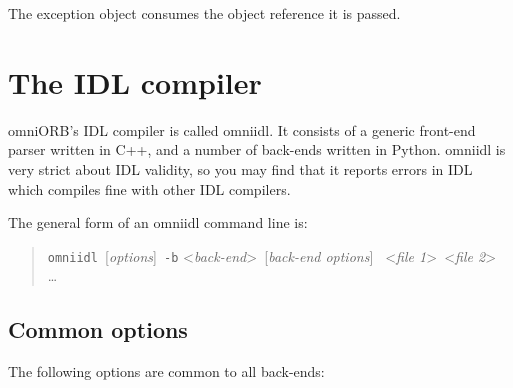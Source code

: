 \documentclass[11pt,twoside,a4paper]{book}
\newcommand{\cmdline}[1]{\texttt{#1}}
\begin{document}
\noindent The exception object consumes the object reference it is
passed.





\chapter{The IDL compiler}
\label{chap:omniidl}

omniORB's IDL compiler is called omniidl. It consists of a generic
front-end parser written in C++, and a number of back-ends written in
Python. omniidl is very strict about IDL validity, so you may find
that it reports errors in IDL which compiles fine with other IDL
compilers.

The general form of an omniidl command line is:

\begin{quote} %
\cmdline{omniidl }[\textit{options}]\cmdline{ -b}%
<\textit{back-end}>\cmdline{ }[\textit{back-end options}]%
\cmdline{ }<\textit{file 1}>\cmdline{ }<\textit{file 2}>%
\cmdline{ }\dots
\end{quote}

\section{Common options}

The following options are common to all back-ends:
\end{document}
